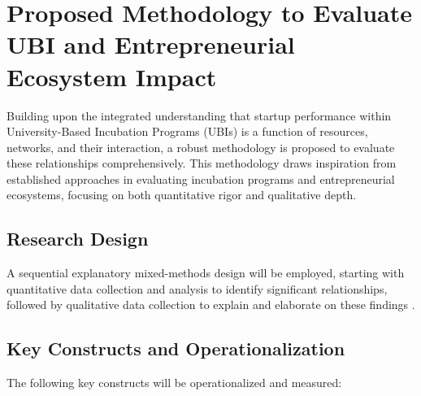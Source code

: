 \documentclass[../Main.tex]{subfiles}
\begin{document}
\section{Proposed Methodology to Evaluate UBI and Entrepreneurial Ecosystem Impact}

Building upon the integrated understanding that startup performance within University-Based Incubation Programs (UBIs) is a function of resources, networks, and their interaction, a robust methodology is proposed to evaluate these relationships comprehensively. This methodology draws inspiration from established approaches in evaluating incubation programs and entrepreneurial ecosystems, focusing on both quantitative rigor and qualitative depth.

\subsection{Research Design}
A sequential explanatory mixed-methods design will be employed, starting with quantitative data collection and analysis to identify significant relationships, followed by qualitative data collection to explain and elaborate on these findings \cite{creswell2014research}.

\subsection{Key Constructs and Operationalization}
The following key constructs will be operationalized and measured:
\end{document}

